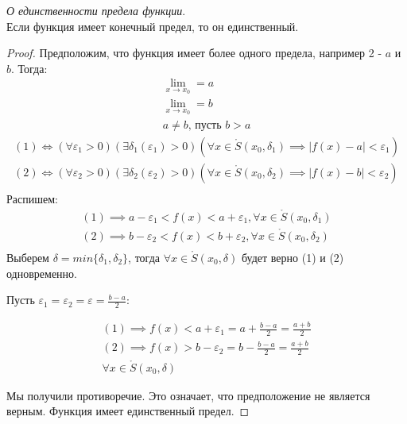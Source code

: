 \begin{theorem}
  \textit{О единственности предела функции}. \\
  Если функция имеет конечный предел, то он единственный.
\end{theorem}
\begin{proof}
 Предположим, что функция имеет более одного предела, например 2 - $a$ и $b$. Тогда:
 \begin{gather*}
   \lim_{x \to x_0} = a \tag{1} \\  
   \lim_{x \to x_0} = b  \tag{2} \\
    a \neq b \text{, пусть } b > a
 \end{gather*}
 \begin{gather*}
   (1) \iff (\forall  \varepsilon_1 > 0)(\exists  \delta_1(\varepsilon_1) > 0)(\forall  x \in  \mathring{S}(x_0, \delta_1) \implies |f(x) - a| < \varepsilon_1) \\
   (2) \iff (\forall  \varepsilon_2 > 0)(\exists  \delta_2(\varepsilon_2) > 0)(\forall  x \in  \mathring{S}(x_0, \delta_2) \implies |f(x) - b| < \varepsilon_2) \\
 \end{gather*}
 Распишем:
 \begin{gather*}
   (1) \implies a - \varepsilon_1 < f(x) < a + \varepsilon_1, \forall  x \in \mathring{S}(x_0, \delta_1) \\
   (2) \implies b - \varepsilon_2 < f(x) < b + \varepsilon_2, \forall  x \in \mathring{S}(x_0, \delta_2) \\
 \end{gather*}
 Выберем $\delta = min \{\delta_1, \delta_2\}$, тогда $\forall x \in  \mathring{S}(x_0, \delta)$
 будет верно (1) и (2) одновременно.

 Пусть $\varepsilon_1 = \varepsilon_2 = \varepsilon = \frac{b - a}{2}$:

 \begin{gather*}
  (1) \implies f(x) < a + \varepsilon_1 = a + \frac{b - a}{2} = \frac{a + b}{2} \\
  (2) \implies f(x) > b - \varepsilon_2 = b - \frac{b - a}{2} = \frac{a + b}{2} \\
  \forall x \in \mathring{S}(x_0, \delta)
 \end{gather*}
 
 Мы получили противоречие. Это означает, что предположение не является верным. Функция имеет единственный предел.
\end{proof}

